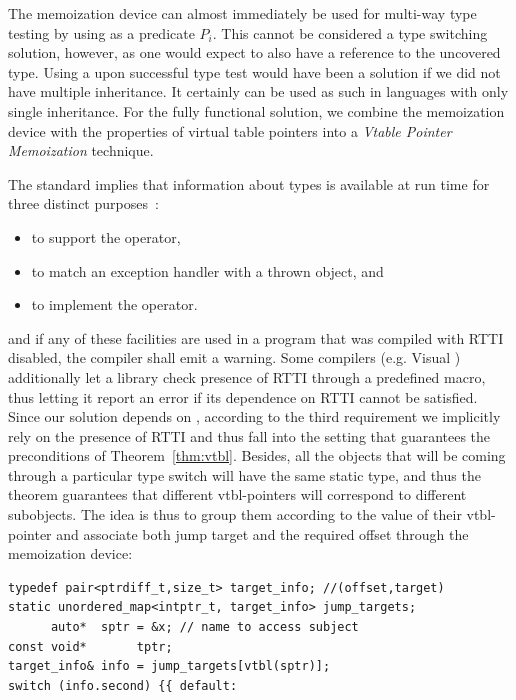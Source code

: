 The memoization device can almost immediately be used for multi-way type testing by 
using  as a predicate $P_i$. This cannot be considered a 
type switching solution, however, as one would expect to also have a reference 
to the uncovered type. Using a  upon successful type test 
would have been a solution if we did not have multiple inheritance. It certainly 
can be used as such in languages with only single inheritance. For the fully 
functional \Cpp{} solution, we combine the memoization device with the properties 
of virtual table pointers into a \emph{Vtable Pointer Memoization} technique.

The \Cpp{} standard implies that information about types is available at run time 
for three distinct purposes~\cite[.1]{C++ABI}:

\begin{itemize}
\setlength{\itemsep}{0pt}
\setlength{\parskip}{0pt}
\item to support the  operator,
\item to match an exception handler with a thrown object, and
\item to implement the  operator.
\end{itemize}

\noindent
and if any of these facilities are used in a program that was compiled with 
RTTI disabled, the compiler shall emit a warning. Some 
compilers (e.g. Visual \Cpp{}) additionally let a library check presence of RTTI 
through a predefined macro, thus letting it report an error if its dependence on 
RTTI cannot be satisfied. Since our solution depends on %
, according to the third requirement we implicitly rely on the presence of RTTI and thus 
fall into the setting that guarantees the preconditions of Theorem~\ref{thm:vtbl}.
Besides, all the objects that will be coming through a particular type switch will 
have the same static type, and thus the theorem guarantees that different vtbl-pointers 
will correspond to different subobjects. The idea is thus to group them 
according to the value of their vtbl-pointer and associate both jump target 
and the required offset through the memoization device:

\begin{lstlisting}
typedef pair<ptrdiff_t,size_t> target_info; //(offset,target)
static unordered_map<intptr_t, target_info> jump_targets;
      auto*  sptr = &x; // name to access subject
const void*       tptr; 
target_info& info = jump_targets[vtbl(sptr)];
switch (info.second) {{ default: 
\end{lstlisting}

